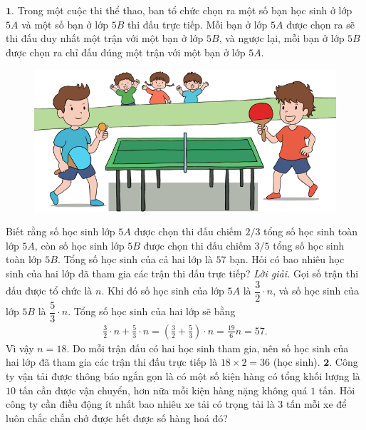 \begin{multicols}{2}
	$\pmb{1.}$	Trong một cuộc thi thể thao, ban tổ chức chọn ra một số bạn học sinh ở lớp $5A$ và một số bạn ở lớp $5B$ thi đấu trực tiếp. Mỗi bạn ở lớp $5A$ được chọn ra sẽ thi đấu duy nhất một trận với một bạn ở lớp $5B$, và ngược lại, mỗi bạn ở lớp $5B$ được chọn ra chỉ đấu đúng một trận với một bạn ở lớp $5A$.
	\begin{figure}[H]
		\centering
		\vspace*{-5pt}
		\captionsetup{labelformat= empty, justification=centering}
		\includegraphics[width=1\linewidth]{Pi5_bai1}
		\vspace*{-10pt}
	\end{figure}
	Biết rằng số học sinh lớp $5A$ được chọn thi đấu chiếm $2/3$ tổng số học sinh toàn lớp $5A$, còn số học sinh lớp $5B$ được chọn thi đấu chiếm $3/5$ tổng số học sinh toàn lớp $5B$. Tổng số học sinh của cả hai lớp là $57$ bạn. Hỏi có bao nhiêu học sinh của hai lớp đã tham gia các trận thi đấu trực tiếp?
	\vskip 0.1cm
	\textit{Lời giải.} 	Gọi số trận thi đấu được tổ chức là $n$. Khi đó số học sinh của lớp $5A$ là $\dfrac{3}{2}\cdot n$, và số học sinh của lớp $5B$ là $\dfrac{5}{3}\cdot n$. Tổng số học sinh của hai lớp sẽ bằng  
	\begin{align*}
		\frac{3}{2}\cdot n + \frac{5}{3}\cdot n = (\frac{3}{2} + \frac{5}{3})\cdot n = \frac{19}{6}n = 57.
	\end{align*}
	Vì vậy $n=18$. 
	\vskip 0.1cm
	Do mỗi trận đấu có hai học sinh tham gia, nên số học sinh của hai lớp đã tham gia các trận thi đấu trực tiếp là $18 \times 2=36$ (học sinh).
	\vskip 0.1cm
	$\pmb{2.}$ Công ty vận tải được thông báo ngắn gọn là có một số kiện hàng có tổng khối lượng là $10$ tấn cần được vận chuyển, hơn nữa mỗi kiện hàng nặng không quá $1$ tấn. Hỏi công ty  cần điều động ít nhất bao nhiêu xe tải có trọng tải là $3$ tấn mỗi xe để luôn chắc chắn chở được hết được số hàng hoá đó?
	\begin{figure}[H]

\end{figure}
\end{multicols}
